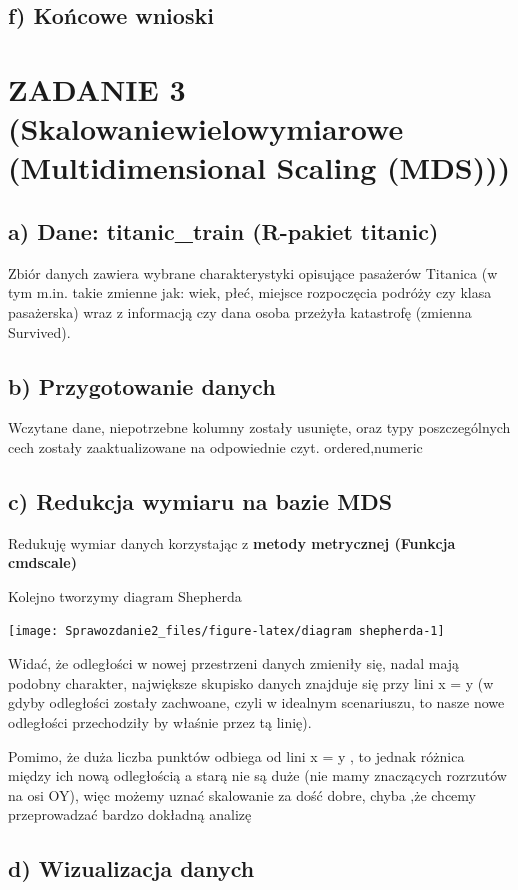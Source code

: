 \documentclass[
  12pt,
]{article}
\begin{document}
\subsection{f) Końcowe wnioski}\label{f-koux144cowe-wnioski-1}

\section{ZADANIE 3 (Skalowaniewielowymiarowe (Multidimensional Scaling
(MDS)))}\label{zadanie-3-skalowaniewielowymiarowe-multidimensional-scaling-mds}

\subsection{a) Dane: titanic\_train (R-pakiet
titanic)}\label{a-dane-titanic_train-r-pakiet-titanic}

Zbiór danych zawiera wybrane charakterystyki opisujące pasażerów
Titanica (w tym m.in. takie zmienne jak: wiek, płeć, miejsce rozpoczęcia
podróży czy klasa pasażerska) wraz z informacją czy dana osoba przeżyła
katastrofę (zmienna Survived).

\subsection{b) Przygotowanie danych}\label{b-przygotowanie-danych}

Wczytane dane, niepotrzebne kolumny zostały usunięte, oraz typy
poszczególnych cech zostały zaaktualizowane na odpowiednie czyt.
ordered,numeric

\subsection{c) Redukcja wymiaru na bazie
MDS}\label{c-redukcja-wymiaru-na-bazie-mds}

Redukuję wymiar danych korzystając z \textbf{metody metrycznej (Funkcja
cmdscale)}

Kolejno tworzymy diagram Shepherda

\begin{center}\texttt{[image: Sprawozdanie2\_files/figure-latex/diagram shepherda-1]} \end{center}

Widać, że odległości w nowej przestrzeni danych zmieniły się, nadal mają
podobny charakter, największe skupisko danych znajduje się przy lini x =
y (w gdyby odległości zostały zachwoane, czyli w idealnym scenariuszu,
to nasze nowe odległości przechodziły by właśnie przez tą linię).

Pomimo, że duża liczba punktów odbiega od lini x = y , to jednak różnica
między ich nową odległością a starą nie są duże (nie mamy znaczących
rozrzutów na osi OY), więc możemy uznać skalowanie za dość dobre, chyba
,że chcemy przeprowadzać bardzo dokładną analizę

\subsection{d) Wizualizacja danych}\label{d-wizualizacja-danych}
\end{document}

